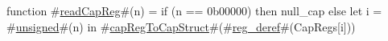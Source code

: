 function #\hyperref[zreadCapReg]{readCapReg}#(n) =
  if (n == 0b00000) then
    null_cap
  else
    let i = #\hyperref[zunsigned]{unsigned}#(n) in
    #\hyperref[zcapRegToCapStruct]{capRegToCapStruct}#(#\hyperref[zregzyderef]{reg\_deref}#(CapRegs[i]))
